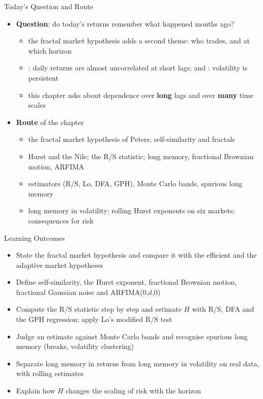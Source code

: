 \begin{frame}{Today's Question and Route}
\itemsize{\small}
\begin{itemize}
    \item \textbf{Question}: do today's returns remember what happened months ago?
    \begin{itemize}
        \item the fractal market hypothesis adds a second theme: who trades, and at which horizon
        \item {}: daily returns are almost uncorrelated at short lags;  and : volatility is persistent
        \item this chapter asks about dependence over \textbf{long} lags and over \textbf{many} time scales
    \end{itemize}
    \item \textbf{Route} of the chapter
    \begin{itemize}
        \item the fractal market hypothesis of Peters; self-similarity and fractals
        \item Hurst and the Nile; the R/S statistic; long memory, fractional Brownian motion, ARFIMA
        \item estimators (R/S, Lo, DFA, GPH), Monte Carlo bands, spurious long memory
        \item long memory in volatility; rolling Hurst exponents on six markets; consequences for risk
    \end{itemize}
\end{itemize}
\end{frame}

\begin{frame}{Learning Outcomes}
\itemsize{\small}
\begin{itemize}
    \item State the fractal market hypothesis and compare it with the efficient and the adaptive market hypotheses
    \item Define self-similarity, the Hurst exponent, fractional Brownian motion, fractional Gaussian noise and ARFIMA(0,$d$,0)
    \item Compute the R/S statistic step by step and estimate $H$ with R/S, DFA and the GPH regression; apply Lo's modified R/S test
    \item Judge an estimate against Monte Carlo bands and recognise spurious long memory (breaks, volatility clustering)
    \item Separate long memory in returns from long memory in volatility on real data, with rolling estimates
    \item Explain how $H$ changes the scaling of risk with the horizon
\end{itemize}
\end{frame}

